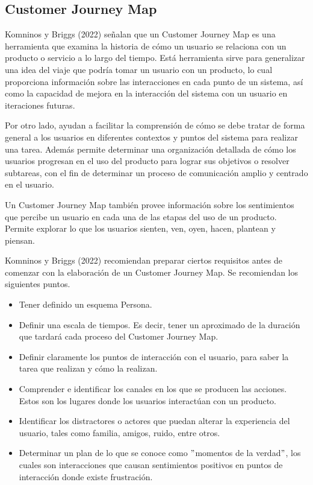 
\subsection{Customer Journey Map}
\label{CustomerJourneyMapCap3}

Komninos y Briggs (2022) señalan que un Customer Journey Map es una herramienta que examina la historia de cómo un usuario se relaciona con un producto o servicio a lo largo del tiempo. Está herramienta sirve para generalizar una idea del viaje que podría tomar un usuario con un producto, lo cual proporciona información sobre las interacciones en cada punto de un sistema, así como la capacidad de mejora en la interacción del sistema con un usuario en iteraciones futuras.

Por otro lado, ayudan a facilitar la comprensión de cómo se debe tratar de forma general a los usuarios en diferentes contextos y puntos del sistema para realizar una tarea. Además permite determinar una organización detallada de cómo los usuarios progresan en el uso del producto para lograr sus objetivos o resolver subtareas, con el fin de determinar un proceso de comunicación amplio y centrado en el usuario.

Un Customer Journey Map también provee información sobre los sentimientos que percibe un usuario en cada una de las etapas del uso de un producto. Permite explorar lo que los usuarios sienten, ven, oyen, hacen, plantean y piensan.

Komninos y Briggs (2022) recomiendan preparar ciertos requisitos antes de comenzar con la elaboración de un Customer Journey Map. Se recomiendan los siguientes puntos.

\begin{itemize}
  \item Tener definido un esquema Persona.
  \item Definir una escala de tiempos. Es decir, tener un aproximado de la duración que tardará cada proceso del Customer Journey Map.
  \item Definir claramente los puntos de interacción con el usuario, para saber la tarea que realizan y cómo la realizan.
  \item Comprender e identificar los canales en los que se producen las acciones. Estos son los lugares donde los usuarios interactúan con un producto.
  \item Identificar los distractores o actores que puedan alterar la experiencia del usuario, tales como familia, amigos, ruido, entre otros.
  \item Determinar un plan de lo que se conoce como $"$momentos de la verdad$"$, los cuales son interacciones que causan sentimientos positivos en puntos de interacción donde existe frustración.
\end{itemize}

